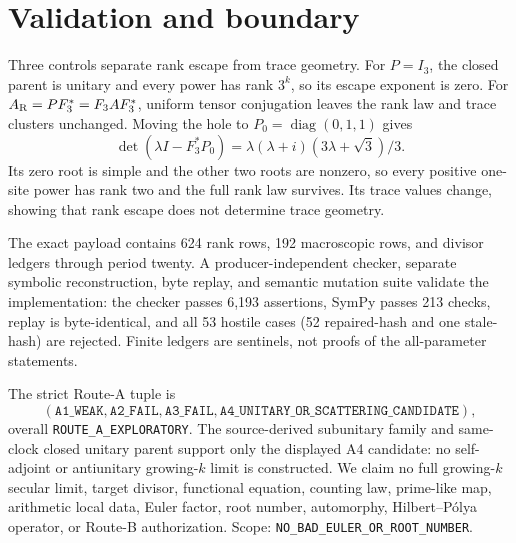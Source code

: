 \documentclass[10pt]{article}
\begin{document}
\section{Validation and boundary}
Three controls separate rank escape from trace geometry.  For $P=I_3$, the
closed parent is unitary and every power has rank $3^k$, so its escape exponent
is zero.  For $A_{\rm R}=PF_3^*=F_3AF_3^*$, uniform tensor conjugation leaves
the rank law and trace clusters unchanged.  Moving the hole to
$P_0=\operatorname{diag}(0,1,1)$ gives
\[
 \det(\lambda I-F_3^*P_0)
 =\lambda(\lambda+i)(3\lambda+\sqrt3)/3.
\]
Its zero root is simple and the other two roots are nonzero, so every positive
one-site power has rank two and the full rank law survives.  Its trace values
change, showing that rank escape does not determine trace geometry.

The exact payload contains 624 rank rows, 192 macroscopic rows, and divisor
ledgers through period twenty.  A producer-independent checker, separate
symbolic reconstruction, byte replay, and semantic mutation suite validate
the implementation: the checker passes 6,193 assertions, SymPy passes 213
checks, replay is byte-identical, and all 53 hostile cases (52 repaired-hash
and one stale-hash) are rejected.  Finite ledgers are sentinels, not proofs of
the all-parameter statements.

The strict Route-A tuple is
\[
(\texttt{A1\_WEAK},\texttt{A2\_FAIL},\texttt{A3\_FAIL},
 \texttt{A4\_UNITARY\_OR\_SCATTERING\_CANDIDATE}),
\]
overall \texttt{ROUTE\_A\_EXPLORATORY}.  The source-derived subunitary family
and same-clock closed unitary parent support only the displayed A4 candidate:
no self-adjoint or antiunitary growing-$k$ limit is constructed.  We claim no
full growing-$k$ secular limit, target divisor, functional equation, counting
law, prime-like map, arithmetic local data, Euler factor, root number,
automorphy, Hilbert--P\'olya operator, or Route-B authorization.
Scope: \texttt{NO\_BAD\_EULER\_OR\_ROOT\_NUMBER}.
\end{document}
